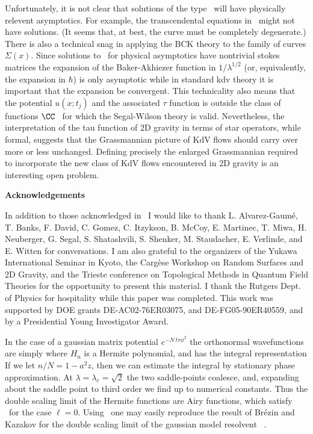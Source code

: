 Unfortunately, it is not clear that solutions of the type 
\thetaf\ will have physically relevent asymptotics. 
For example, the transcendental equations in \novikov\krich\ 
might not have solutions. (It seems that, at best, the 
curve must be completely degenerate.)
There is also a technical snag
in applying the BCK theory to the family of 
curves $\Sigma(x)$. Since solutions 
to \linsys\ for physical asymptotics have nontrivial 
stokes matrices
the expansion of the Baker-Akhiezer 
function in $1/\lambda^{1/2}$ (or, equivalently, the 
expansion in $\hbar$) is only asymptotic while in standard
kdv theory it is important that the expansion be convergent.
This technicality also means that the potential 
$u(x;t_j)$ and the associated $\tau$ function
is outside the class of functions $\CC$ \segal\ for which 
the Segal-Wilson theory is valid.
Nevertheless, the interpretation of the 
tau function of 2D gravity in terms of star operators, 
while formal, suggests that the Grassmannian 
picture of KdV flows should carry over more or 
less unchanged. Defining precisely the
enlarged Grassmannian required to incorporate the
new class of KdV flows encountered in 2D gravity 
is an interesting open problem.

\bigskip
\bigskip
\centerline{\bf Acknowledgements}

In addition to those acknowledged in \geom\ I would 
like to thank L. Alvarez-Gaum\'e, T. Banks, F. David,
C. Gomez, C. Itzykson,
B. McCoy, E. Martinec, T. Miwa, H. Neuberger,
G. Segal, S. Shatashvili, S. Shenker, M. Staudacher, 
E. Verlinde, and E. Witten
for conversations. I am also grateful to 
the organizers of the 
Yukawa International Seminar in Kyoto, the
Carg\`ese Workshop on Random Surfaces and 2D Gravity,
and the Trieste conference on 
Topological Methods in Quantum Field Theories for the 
opportunity to present this material.
I thank the Rutgers Dept. of Physics for hospitality 
while this paper was completed.
This work was supported by DOE grants DE-AC02-76ER03075, 
and DE-FG05-90ER40559,
and by a Presidential Young Investigator Award.


In the case of a gaussian matrix potential $e^{-N~ tr\phi^2}$
the orthonormal wavefunctions are simply
\eqn\herfun{
p_n(\lambda)={N^{1/4}\over 2^{n/2}\pi^{1/4}\sqrt{n!}} H_n(\sqrt{N}\lambda)
e^{-N\lambda^2/2} }
where $H_n$ is a Hermite polynomial, and has the integral 
representation
\eqn{}
If we let $n/N=1-a^2 z$, then we can estimate the 
integral by stationary phase approximation. 
At $\lambda=\lambda_c=\sqrt{2}$
the two saddle-points coalesce, and, expanding about the 
saddle point to third order we find
\eqn{}
up to numerical constants. Thus the double scaling limit 
of the Hermite functions are
Airy functions, which satisfy \linsys\ for the 
case $\ell=0$. Using \herdsl\ one may easily reproduce 
the result of Br\'ezin and Kazakov for the double scaling 
limit of the gaussian model resolvent \BK\ .

\listrefs
\bye



